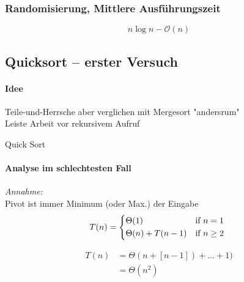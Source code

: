 \documentclass[a4paper]{scrartcl}
\begin{document}
			\subsubsection{Randomisierung, Mittlere Ausführungszeit} 
			\[ n \log n - \mathcal{O} (n) \]
	
		\subsection{Quicksort – erster Versuch}
	
		\paragraph{Idee}
		Teile-und-Herrsche aber verglichen mit Mergesort "andersrum"\\
		Leiste Arbeit vor rekursivem Aufruf\\
		
		\begin{algorithm}
			\caption{Quick Sort}
			\DontPrintSemicolon
			
		\end{algorithm}
	
		\paragraph{Analyse im schlechtesten Fall}
		\emph{Annahme:}\\
		Pivot ist immer Minimum (oder Max.) der Eingabe \\
		\[
			T(n) = 
		\begin{dcases*}
			\Theta(1) & if \(n = 1\)\\
			\Theta(n) +T(n-1) & if \(n \geq 2\)
		\end{dcases*}
		\]
		
		\begin{align*}
			T(n) &= \Theta(n + [n - 1]) + \dots +1) \\
			&= \Theta(n^2)\\
		\end{align*}
		
\end{document}
